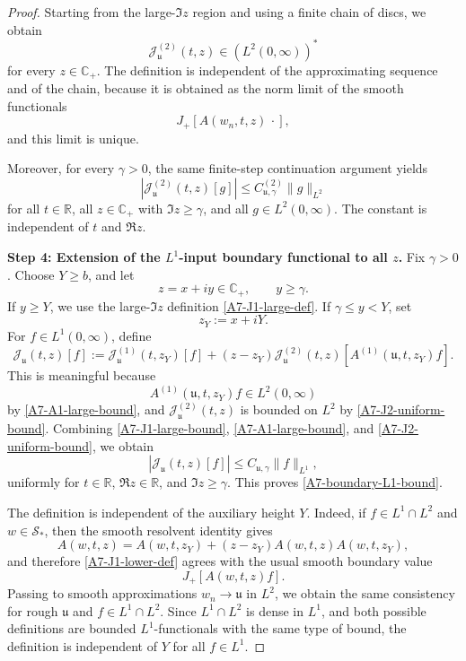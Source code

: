\documentclass[10pt,a4paper]{amsart}
\begin{document}
\begin{proof}
Starting from the large-\(\Im z\) region and using a finite chain of discs, we
obtain
\[
\mathcal J^{(2)}_{\mathfrak u}(t,z)\in (L^2(0,\infty))^*
\]
for every \(z\in\mathbb C_+\). The definition is independent of the approximating
sequence and of the chain, because it is obtained as the norm limit of the smooth
functionals
\[
J_+[A(w_n,t,z)\,\cdot],
\]
and this limit is unique.

Moreover, for every \(\gamma>0\), the same finite-step continuation argument yields
\begin{equation}
\label{A7-J2-uniform-bound}
|\mathcal J^{(2)}_{\mathfrak u}(t,z)[g]|
\le
C^{(2)}_{\mathfrak u,\gamma}\|g\|_{L^2}
\end{equation}
for all \(t\in\mathbb R\), all \(z\in\mathbb C_+\) with
\(\Im z\ge\gamma\), and all \(g\in L^2(0,\infty)\). The constant is independent
of \(t\) and \(\Re z\).

\medskip
\noindent
\textbf{Step 4: Extension of the \(L^1\)-input boundary functional to all \(z\).}
Fix \(\gamma>0\). Choose \(Y\ge b\), and let
\[
z=x+iy\in\mathbb C_+,
\qquad y\ge\gamma.
\]
If \(y\ge Y\), we use the large-\(\Im z\) definition
\eqref{A7-J1-large-def}. If \(\gamma\le y<Y\), set
\[
z_Y:=x+iY.
\]
For \(f\in L^1(0,\infty)\), define
\begin{equation}
\label{A7-J1-lower-def}
\mathcal J_{\mathfrak u}(t,z)[f]
:=
\mathcal J^{(1)}_{\mathfrak u}(t,z_Y)[f]
+
(z-z_Y)
\mathcal J^{(2)}_{\mathfrak u}(t,z)
\left[
A^{(1)}(\mathfrak u,t,z_Y)f
\right].
\end{equation}
This is meaningful because
\[
A^{(1)}(\mathfrak u,t,z_Y)f\in L^2(0,\infty)
\]
by \eqref{A7-A1-large-bound}, and
\(\mathcal J^{(2)}_{\mathfrak u}(t,z)\) is bounded on \(L^2\) by
\eqref{A7-J2-uniform-bound}. Combining \eqref{A7-J1-large-bound},
\eqref{A7-A1-large-bound}, and \eqref{A7-J2-uniform-bound}, we obtain
\[
|\mathcal J_{\mathfrak u}(t,z)[f]|
\le
C_{\mathfrak u,\gamma}\|f\|_{L^1},
\]
uniformly for \(t\in\mathbb R\), \(\Re z\in\mathbb R\), and \(\Im z\ge\gamma\).
This proves \eqref{A7-boundary-L1-bound}.

The definition is independent of the auxiliary height \(Y\). Indeed, if
\(f\in L^1\cap L^2\) and \(w\in\mathcal S_*\), then the smooth resolvent identity
gives
\[
A(w,t,z)
=
A(w,t,z_Y)
+
(z-z_Y)A(w,t,z)A(w,t,z_Y),
\]
and therefore \eqref{A7-J1-lower-def} agrees with the usual smooth boundary
value
\[
J_+[A(w,t,z)f].
\]
Passing to smooth approximations \(w_n\to\mathfrak u\) in \(L^2\), we obtain the
same consistency for rough \(\mathfrak u\) and \(f\in L^1\cap L^2\). Since
\(L^1\cap L^2\) is dense in \(L^1\), and both possible definitions are bounded
\(L^1\)-functionals with the same type of bound, the definition is independent
of \(Y\) for all \(f\in L^1\).


\end{proof}
\end{document}
